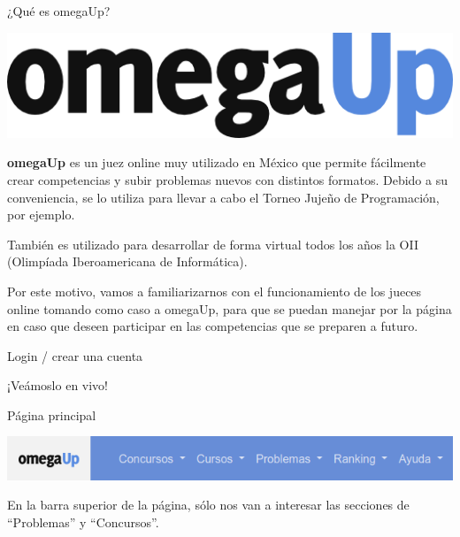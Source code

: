 \documentclass{beamer}
\begin{document}
    \begin{frame}{¿Qué es omegaUp?}
        \begin{center}
            \href{https://omegaup.com/}{\includegraphics[width=.4\linewidth]{./res/omegaup_curves.png}}
        \end{center}\pause

        \textbf{omegaUp} es un juez online muy utilizado en México que permite fácilmente crear competencias y subir problemas nuevos con distintos formatos. Debido a su conveniencia, se lo utiliza para llevar a cabo el Torneo Jujeño de Programación, por ejemplo. \pause

        También es utilizado para desarrollar de forma virtual todos los años la OII (Olimpíada Iberoamericana de Informática). \pause \vspace{4pt}

        Por este motivo, vamos a familiarizarnos con el funcionamiento de los jueces online tomando como caso a omegaUp, para que se puedan manejar por la página en caso que deseen participar en las competencias que se preparen a futuro.
    \end{frame}

    \begin{frame}{Login / crear una cuenta}
        \begin{center}
            \LARGE¡Veámoslo en vivo!
        \end{center}
    \end{frame}

    \begin{frame}{Página principal}
        \begin{center}
            \includegraphics[width=.8\linewidth]{./res/ou_topbar.png}
        \end{center} \pause
        En la barra superior de la página, sólo nos van a interesar las secciones de ``Problemas'' y ``Concursos''.
    \end{frame}
\end{document}
